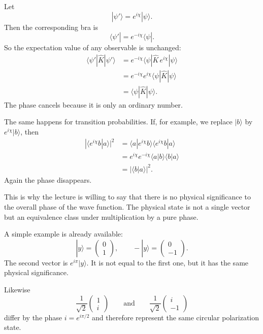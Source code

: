 Let
\begin{equation}
|\psi'\rangle=e^{i\chi}|\psi\rangle.
\end{equation}
Then the corresponding bra is
\begin{equation}
\langle\psi'|=e^{-i\chi}\langle\psi|.
\end{equation}
So the expectation value of any observable is unchanged:
\begin{align}
\langle\psi'|\hat K|\psi'\rangle
&=
e^{-i\chi}\langle\psi|\hat K\,e^{i\chi}|\psi\rangle \\
&=
e^{-i\chi}e^{i\chi}\langle\psi|\hat K|\psi\rangle \\
&=
\langle\psi|\hat K|\psi\rangle.
\end{align}
The phase cancels because it is only an ordinary number.

The same happens for transition probabilities. If, for example, we replace $|b\rangle$ by $e^{i\chi}|b\rangle$, then
\begin{align}
|\langle e^{i\chi}b|a\rangle|^2
&=
\langle a|e^{i\chi}b\rangle \langle e^{i\chi}b|a\rangle \\
&=
e^{i\chi}e^{-i\chi}\langle a|b\rangle\langle b|a\rangle \\
&=
|\langle b|a\rangle|^2.
\end{align}
Again the phase disappears.

This is why the lecture is willing to say that there is no physical significance to the overall phase of the wave function. The physical state is not a single vector but an equivalence class under multiplication by a pure phase.

A simple example is already available:
\begin{equation}
|y\rangle=
\begin{pmatrix}
0\\
1
\end{pmatrix},
\qquad
-|y\rangle=
\begin{pmatrix}
0\\
-1
\end{pmatrix}.
\end{equation}
The second vector is $e^{i\pi}|y\rangle$. It is not equal to the first one, but it has the same physical significance.

Likewise
\begin{equation}
\frac{1}{\sqrt2}
\begin{pmatrix}
1\\
i
\end{pmatrix}
\qquad\text{and}\qquad
\frac{1}{\sqrt2}
\begin{pmatrix}
i\\
-1
\end{pmatrix}
\end{equation}
differ by the phase $i=e^{i\pi/2}$ and therefore represent the same circular polarization state.

